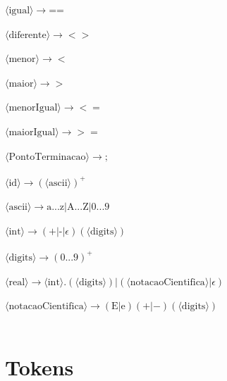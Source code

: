 \documentclass[11pt]{article}
\begin{document}
$\langle\text{igual}\rangle \rightarrow   \textbf{==}$\\\\
$\langle\text{diferente}\rangle \rightarrow  <>$\\\\
$\langle\text{menor}\rangle \rightarrow  <$\\\\
$\langle\text{maior}\rangle \rightarrow  >$\\\\
$\langle\text{menorIgual}\rangle \rightarrow  <=$\\\\
$\langle\text{maiorIgual}\rangle \rightarrow  >=$\\\\
$\langle\text{PontoTerminacao}\rangle \rightarrow \textbf{;}$\\\\
$\langle\text{id}\rangle \rightarrow (\langle\text{ascii}\rangle)^{+}$\\\\
$\langle\text{ascii}\rangle \rightarrow \text{a...z}|\text{A...Z}|\text{0...9}$\\\\
$\langle\text{int}\rangle \rightarrow (\textbf{+}|\text{-}|\epsilon)(\langle\text{digits}\rangle)$\\\\
$\langle\text{digits}\rangle \rightarrow (\text{0...9})^{+}$\\\\
$\langle\text{real}\rangle \rightarrow \langle\text{int}\rangle \textbf{.}(\langle\text{digits}\rangle) | (\langle\text{notacaoCientifica}\rangle | \epsilon)$\\\\
$\langle\text{notacaoCientifica}\rangle \rightarrow (\text{E}|\text{e})(+|-)(\langle\text{digits}\rangle)$\\\\

\section{Tokens}
\end{document}
